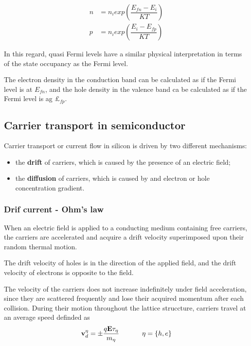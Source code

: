 \begin{align}
n & = n_i exp\left(\dfrac{E_{fn}-E_i}{KT}\right) \label{eq: non eq n density mb}\\
p & = n_i exp\left(\dfrac{E_i-E_{fp}}{KT}\right)  \label{eq: non eq p density mb}
\end{align}

In this regard, quasi Fermi levels have a similar physical interpretation in terms of the state occupancy as the Fermi level.
\begin{Osservazione}
The electron density in the conduction band can be calculated as if the Fermi level is at $E_{fn}$, and the hole density in the valence band ca be calculated as if the Fermi level is ag $£_{fp}$.
\end{Osservazione}

\subsection{Carrier transport in semiconductor}

Carrier transport or current flow in silicon is driven by two different mechanisms:
\begin{itemize}
\item the \textbf{drift} of carriers, which is caused by the presence of an electric field;
\item the \textbf{diffusion} of carriers, which is caused by and electron or hole concentration gradient.
\end{itemize}

\subsubsection{Drif current - Ohm's law}

When an electric field is applied to a conducting medium containing free carriers, the carriers are accelerated and acquire a drift velocity superimposed upon their random thermal motion.

\begin{Osservazione}
The drift velocity of holes is in the direction of the applied field, and the drift velocity of electrons is opposite to the field.
\end{Osservazione}

The velocity of the carriers does not increase indefinitely under field acceleration, since they are scattered frequently and lose their acquired momentum after each collision.
During their motion throughout the lattice struccture, carriers travel at an average speed definded as
\begin{equation}
\vect{v}_d^\eta = \pm \dfrac{q\vect{E}\tau_\eta}{m_\eta}  \psp{20} \eta=\{h,e\}
\end{equation}

